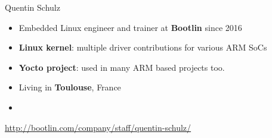 \begin{frame}{Quentin Schulz}
    \begin{itemize}
	\item Embedded Linux engineer and trainer at {\bf Bootlin}
              since 2016
	\item {\bf Linux kernel}: multiple driver contributions for
              various ARM SoCs
	\item {\bf Yocto project}: used in many ARM based projects too.
	\item Living in {\bf Toulouse}, France
	\item {}
    \end{itemize}
    {\small \url{http://bootlin.com/company/staff/quentin-schulz/}}
\end{frame}
